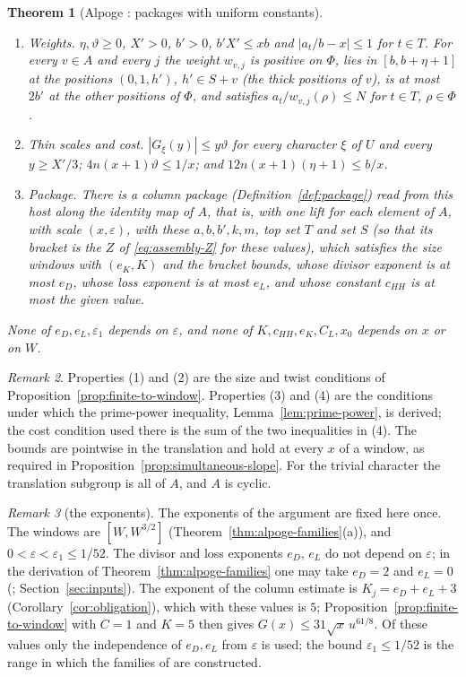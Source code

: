 \documentclass[10pt]{amsart}
\newtheorem{theorem}{Theorem}[section]
\theoremstyle{definition}
\theoremstyle{remark}
\newtheorem{remark}[theorem]{Remark}
\begin{document}
\begin{theorem}[Alpoge \cite{CharacterFamily}: packages with uniform constants]
\begin{enumerate}
\begin{enumerate}
\item[(3)] \emph{Weights.} $\eta,\vartheta\ge0$, $X'>0$, $b'>0$, $b'X'\le xb$ and
$|a_t/b-x|\le1$ for $t\in T$. For every $v\in A$ and every $j$ the weight
$w_{v,j}$ is positive on $\Phi$, lies in $[b,b+\eta+1]$ at the positions
$(0,1,h')$, $h'\in S+v$ (the \emph{thick positions} of $v$), is at most
$2b'$ at the other positions of $\Phi$, and satisfies
$a_t/w_{v,j}(\rho)\le N$ for $t\in T$, $\rho\in\Phi$.
\item[(4)] \emph{Thin scales and cost.} $|G_\xi(y)|\le y\vartheta$ for every
character $\xi$ of $U$ and every $y\ge X'/3$;
$4n(x+1)\vartheta\le1/x$; and $12n(x+1)(\eta+1)\le b/x$.
\item[(5)] \emph{Package.} There is a column package
(Definition~\ref{def:package}) read from this host along the identity map of
$A$, that is, with one lift for each element of $A$, with scale
$(x,\varepsilon)$, with these $a,b,b',k,m$, top set $T$ and set $S$ (so that
its bracket is the $Z$ of \eqref{eq:assembly-Z} for these values), which
satisfies the size windows with $(e_K,K)$ and the
bracket bounds, whose divisor exponent is at most $e_D$, whose loss exponent
is at most $e_L$, and whose constant $c_{HH}$ is at most the given value.
\end{enumerate}
\end{enumerate}
None of $e_D,e_L,\varepsilon_1$ depends on $\varepsilon$, and none of
$K,c_{HH},e_K,C_L,x_0$ depends on $x$ or on $W$.
\end{theorem}
\begin{remark}\label{rem:alpoge-families}
Properties (1) and (2) are the size and twist conditions of
Proposition~\ref{prop:finite-to-window}. Properties (3) and (4) are the
conditions under which the prime-power inequality,
Lemma~\ref{lem:prime-power}, is derived; the cost condition used
there is the sum of the two inequalities in (4). The bounds are pointwise in
the translation and hold at every $x$ of a window, as required in
Proposition~\ref{prop:simultaneous-slope}.
For the trivial character the translation subgroup is all of $A$, and $A$
is cyclic.
\end{remark}

\begin{remark}[the exponents]\label{rem:exponents}
The exponents of the argument are fixed here once. The windows are
$[W,W^{3/2}]$ (Theorem~\ref{thm:alpoge-families}(a)), and
$0<\varepsilon<\varepsilon_1\le1/52$. The divisor and loss exponents $e_D$,
$e_L$ do not depend on $\varepsilon$; in the derivation of
Theorem~\ref{thm:alpoge-families} one may take $e_D=2$ and $e_L=0$
(\cite[Theorem~\ref{A-i4:thm-final}, Step~2]{Annex};
Section~\ref{sec:inputs}). The exponent of the column estimate is
$K_j=e_D+e_L+3$ (Corollary~\ref{cor:obligation}), which with these values is
$5$; Proposition~\ref{prop:finite-to-window} with $C=1$ and $K=5$ then gives
$G(x)\le31\sqrt{x}\,u^{61/8}$. Of these values only the independence of
$e_D,e_L$ from $\varepsilon$ is used; the bound $\varepsilon_1\le1/52$ is
the range in which the families of \cite{Annex} are constructed.
\end{remark}
\end{document}
